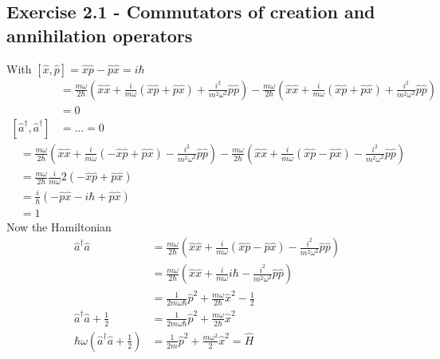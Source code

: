 \documentclass[../main.tex]{subfiles}
\begin{document}
\subsection*{Exercise 2.1 - Commutators of creation and annihilation operators}
With $[\hat{x},\hat{p}]=\hat{x}\hat{p}-\hat{p}\hat{x}=i\hbar$
\begin{align}
[\hat{a},\hat{a}]
&=\frac{m\omega}{2\hbar}\left(\hat{x}\hat{x}+\frac{i}{m\omega}(\hat{x}\hat{p}+\hat{p}\hat{x})+\frac{i^2}{m^2\omega^2}\hat{p}\hat{p}\right)-\frac{m\omega}{2\hbar}\left(\hat{x}\hat{x}+\frac{i}{m\omega}(\hat{x}\hat{p}+\hat{p}\hat{x})+\frac{i^2}{m^2\omega^2}\hat{p}\hat{p}\right)\\
&=0\\
[\hat{a}^\dagger,\hat{a}^\dagger]
&=...=0
\end{align}
\begin{align}
[\hat{a},\hat{a}^\dagger]
&=\frac{m\omega}{2\hbar}\left(\hat{x}\hat{x}+\frac{i}{m\omega}(-\hat{x}\hat{p}+\hat{p}\hat{x})-\frac{i^2}{m^2\omega^2}\hat{p}\hat{p}\right)-\frac{m\omega}{2\hbar}\left(\hat{x}\hat{x}+\frac{i}{m\omega}(\hat{x}\hat{p}-\hat{p}\hat{x})-\frac{i^2}{m^2\omega^2}\hat{p}\hat{p}\right)\\
&=\frac{m\omega}{2\hbar}\frac{i}{m\omega}2(-\hat{x}\hat{p}+\hat{p}\hat{x})\\
&=\frac{i}{\hbar}(-\hat{p}\hat{x}-i\hbar+\hat{p}\hat{x})\\
&=1
\end{align}
Now the Hamiltonian
\begin{align}
\hat{a}^\dagger\hat{a}
&=\frac{m\omega}{2\hbar}\left(\hat{x}\hat{x}+\frac{i}{m\omega}(\hat{x}\hat{p}-\hat{p}\hat{x})-\frac{i^2}{m^2\omega^2}\hat{p}\hat{p}\right)\\
&=\frac{m\omega}{2\hbar}\left(\hat{x}\hat{x}+\frac{i}{m\omega}i\hbar-\frac{i^2}{m^2\omega^2}\hat{p}\hat{p}\right)\\
&=\frac{1}{2m\omega\hbar}\hat{p}^2+\frac{m\omega}{2\hbar}\hat{x}^2-\frac{1}{2}\\
\hat{a}^\dagger\hat{a}+\frac{1}{2}&=\frac{1}{2m\omega\hbar}\hat{p}^2+\frac{m\omega}{2\hbar}\hat{x}^2\\
\hbar\omega\left(\hat{a}^\dagger\hat{a}+\frac{1}{2}\right)&=\frac{1}{2m}\hat{p}^2+\frac{m\omega^2}{2}\hat{x}^2=\hat{H}
\end{align}
\end{document}
